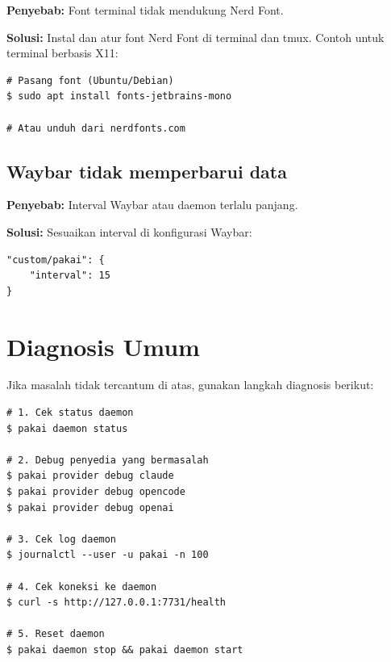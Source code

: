\textbf{Penyebab:} Font terminal tidak mendukung Nerd Font.

\textbf{Solusi:} Instal dan atur font Nerd Font di terminal dan tmux. Contoh untuk
terminal berbasis X11:
\begin{lstlisting}[style=terminal]
# Pasang font (Ubuntu/Debian)
$ sudo apt install fonts-jetbrains-mono

# Atau unduh dari nerdfonts.com
\end{lstlisting}

\subsection{Waybar tidak memperbarui data}

\textbf{Penyebab:} Interval Waybar atau daemon terlalu panjang.

\textbf{Solusi:} Sesuaikan interval di konfigurasi Waybar:
\begin{lstlisting}[style=toml]
"custom/pakai": {
    "interval": 15
}
\end{lstlisting}

\section{Diagnosis Umum}

Jika masalah tidak tercantum di atas, gunakan langkah diagnosis berikut:

\begin{lstlisting}[style=terminal]
# 1. Cek status daemon
$ pakai daemon status

# 2. Debug penyedia yang bermasalah
$ pakai provider debug claude
$ pakai provider debug opencode
$ pakai provider debug openai

# 3. Cek log daemon
$ journalctl --user -u pakai -n 100

# 4. Cek koneksi ke daemon
$ curl -s http://127.0.0.1:7731/health

# 5. Reset daemon
$ pakai daemon stop && pakai daemon start
\end{lstlisting}
